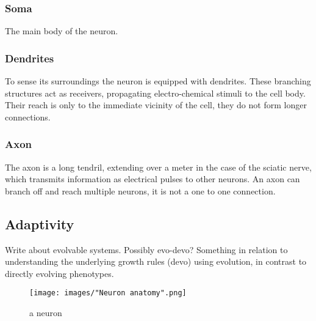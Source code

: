 \subsubsection{Soma}
The main body of the neuron.
\subsubsection{Dendrites}
To sense its surroundings the neuron is equipped with dendrites. These
branching structures act as receivers, propagating electro-chemical stimuli to
the cell body. Their reach is only to the immediate vicinity of the cell, they
do not form longer connections.
\subsubsection{Axon}
The axon is a long tendril, extending over a meter in the case of the sciatic
nerve, which transmits information as electrical pulses to other neurons. An
axon can branch off and reach multiple neurons, it is not a one to one
connection.
\subsection{Adaptivity}
Write about evolvable systems. Possibly evo-devo?
Something in relation to understanding the underlying growth rules (devo) using
evolution, in contrast to directly evolving phenotypes.

\begin{figure*}[p]
    \centering
    \texttt{[image: images/"Neuron anatomy".png]}
    \caption{a neuron}
    \label{fig:neuron_anatomy}
\end{figure*}

